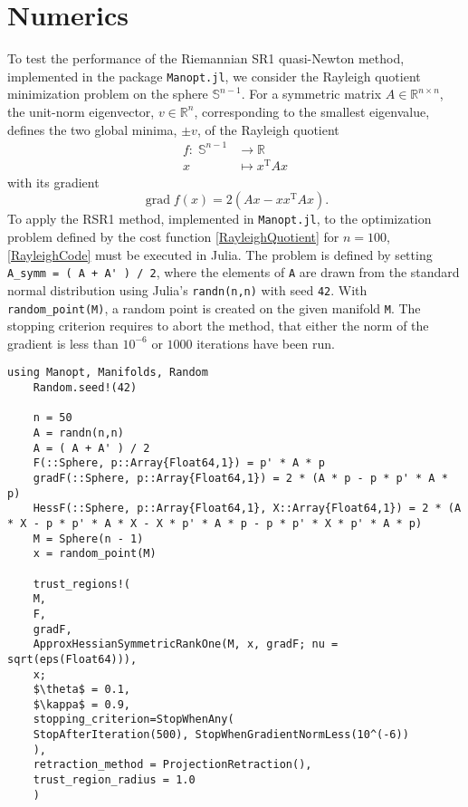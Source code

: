 \chapter{Numerics}

To test the performance of the Riemannian SR1 quasi-Newton method, implemented in the package \lstinline!Manopt.jl!, we consider the Rayleigh quotient minimization problem on the sphere $\mathbb{S}^{n-1}$. For a symmetric matrix $A \in \mathbb{R}^{n \times n}$, the unit-norm eigenvector, $v \in \mathbb{R}^n$, corresponding to the smallest eigenvalue, defines the two global minima, $\pm v$, of the Rayleigh quotient  
\begin{equation}\label{RayleighQuotient}
    \begin{split}
        f \colon \; \mathbb{S}^{n-1} & \to \mathbb{R} \\
        x & \mapsto x^{\mathrm{T}} A x 
    \end{split}
\end{equation}   
with its gradient 
\begin{equation*}
    \operatorname{grad} f(x) = 2(Ax - x x^{\mathrm{T}} A x).
\end{equation*}
To apply the RSR1 method, implemented in \lstinline!Manopt.jl!, to the optimization problem defined by the cost function \cref{RayleighQuotient} for $n=100$, \cref{RayleighCode} must be executed in Julia. The problem is defined by setting \lstinline!A_symm = ( A + A' ) / 2!, where the elements of \lstinline!A! are drawn from the standard normal distribution using Julia’s \lstinline!randn(n,n)! with seed \lstinline!42!. With \lstinline!random_point(M)!, a random point is created on the given manifold \lstinline!M!. The stopping criterion requires to abort the method, that either the norm of the gradient is less than $10^{-6}$ or $1000$ iterations have been run. \\
\begin{lstlisting}[mathescape, caption={The Rayleigh quotient minimization experiment in Julia for $n = 500$.}, label={RayleighCode}]
    using Manopt, Manifolds, Random
    Random.seed!(42)

    n = 50
    A = randn(n,n)
    A = ( A + A' ) / 2
    F(::Sphere, p::Array{Float64,1}) = p' * A * p
    gradF(::Sphere, p::Array{Float64,1}) = 2 * (A * p - p * p' * A * p)
    HessF(::Sphere, p::Array{Float64,1}, X::Array{Float64,1}) = 2 * (A * X - p * p' * A * X - X * p' * A * p - p * p' * X * p' * A * p)
    M = Sphere(n - 1)
    x = random_point(M)

    trust_regions!(
    M,
    F,
    gradF,
    ApproxHessianSymmetricRankOne(M, x, gradF; nu = sqrt(eps(Float64))),
    x;
    $\theta$ = 0.1,
    $\kappa$ = 0.9,
    stopping_criterion=StopWhenAny(
    StopAfterIteration(500), StopWhenGradientNormLess(10^(-6))
    ),
    retraction_method = ProjectionRetraction(),
    trust_region_radius = 1.0
    )
\end{lstlisting}

